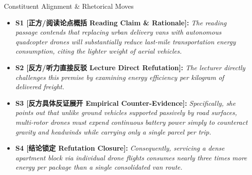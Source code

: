 \begin{TipBox}{Constituent Alignment \& Rhetorical Moves}
\begin{itemize}[leftmargin=1.5em]
  \item \textbf{S1 [正方/阅读论点概括 Reading Claim \& Rationale]:} \textit{The reading passage contends that replacing urban delivery vans with autonomous quadcopter drones will substantially reduce last-mile transportation energy consumption, citing the lighter weight of aerial vehicles.}\par{}
  \item \textbf{S2 [反方/听力直接反驳 Lecture Direct Refutation]:} \textit{The lecturer directly challenges this premise by examining energy efficiency per kilogram of delivered freight.}\par{}
  \item \textbf{S3 [反方具体反证展开 Empirical Counter-Evidence]:} \textit{Specifically, she points out that unlike ground vehicles supported passively by road surfaces, multi-rotor drones must expend continuous battery power simply to counteract gravity and headwinds while carrying only a single parcel per trip.}\par{}
  \item \textbf{S4 [结论锁定 Refutation Closure]:} \textit{Consequently, servicing a dense apartment block via individual drone flights consumes nearly three times more energy per package than a single consolidated van route.}\par{}
\end{itemize}
\end{TipBox}
\bigskip

